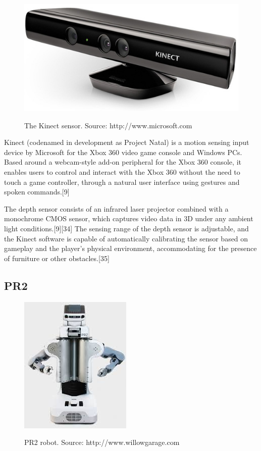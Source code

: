 \begin{figure}

{\includegraphics[width=0.5\columnwidth]{figures/kinect.jpg}}

\caption{The Kinect sensor. Source: http://www.microsoft.com}
\label{fig:kinect}
\end{figure}

Kinect (codenamed in development as Project Natal) is a motion sensing input device by Microsoft for the Xbox 360 video game console and Windows PCs. Based around a webcam-style add-on peripheral for the Xbox 360 console, it enables users to control and interact with the Xbox 360 without the need to touch a game controller, through a natural user interface using gestures and spoken commands.[9]

The depth sensor consists of an infrared laser projector combined with a monochrome CMOS sensor, which captures video data in 3D under any ambient light conditions.[9][34] The sensing range of the depth sensor is adjustable, and the Kinect software is capable of automatically calibrating the sensor based on gameplay and the player's physical environment, accommodating for the presence of furniture or other obstacles.[35]
\subsection{PR2}

\begin{figure}

{\includegraphics[width=0.5\columnwidth]{figures/pr2.jpeg}}

\caption{PR2 robot. Source: http://www.willowgarage.com}
\label{fig:pr2}
\end{figure}

